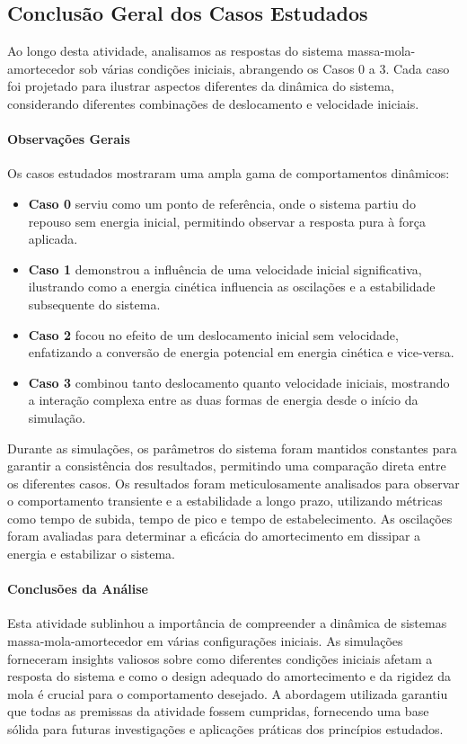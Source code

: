 \subsection{Conclusão Geral dos Casos Estudados}

Ao longo desta atividade, analisamos as respostas do sistema massa-mola-amortecedor sob várias condições iniciais, abrangendo os Casos 0 a 3. Cada caso foi projetado para ilustrar aspectos diferentes da dinâmica do sistema, considerando diferentes combinações de deslocamento e velocidade iniciais.

\paragraph{Observações Gerais}

Os casos estudados mostraram uma ampla gama de comportamentos dinâmicos:
\begin{itemize}
    \item \textbf{Caso 0} serviu como um ponto de referência, onde o sistema partiu do repouso sem energia inicial, permitindo observar a resposta pura à força aplicada.
    \item \textbf{Caso 1} demonstrou a influência de uma velocidade inicial significativa, ilustrando como a energia cinética influencia as oscilações e a estabilidade subsequente do sistema.
    \item \textbf{Caso 2} focou no efeito de um deslocamento inicial sem velocidade, enfatizando a conversão de energia potencial em energia cinética e vice-versa.
    \item \textbf{Caso 3} combinou tanto deslocamento quanto velocidade iniciais, mostrando a interação complexa entre as duas formas de energia desde o início da simulação.
\end{itemize}

Durante as simulações, os parâmetros do sistema foram mantidos constantes para garantir a consistência dos resultados, permitindo uma comparação direta entre os diferentes casos. Os resultados foram meticulosamente analisados para observar o comportamento transiente e a estabilidade a longo prazo, utilizando métricas como tempo de subida, tempo de pico e tempo de estabelecimento. As oscilações foram avaliadas para determinar a eficácia do amortecimento em dissipar a energia e estabilizar o sistema.

\paragraph{Conclusões da Análise}
Esta atividade sublinhou a importância de compreender a dinâmica de sistemas massa-mola-amortecedor em várias configurações iniciais. As simulações forneceram insights valiosos sobre como diferentes condições iniciais afetam a resposta do sistema e como o design adequado do amortecimento e da rigidez da mola é crucial para o comportamento desejado. A abordagem utilizada garantiu que todas as premissas da atividade fossem cumpridas, fornecendo uma base sólida para futuras investigações e aplicações práticas dos princípios estudados.
